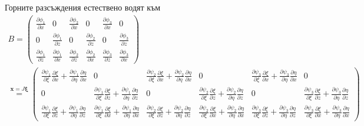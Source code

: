 \documentclass{report}
\begin{document}
	Горните разсъждения естествено водят към
	\begin{align*}
		B=		\begin{pmatrix}
			\frac{\partial \phi_1}{\partial x} & 0 & \frac{\partial \phi_2}{\partial x} & 0 & \frac{\partial \phi_3}{\partial x} & 0\\
			0 & \frac{\partial \phi_1}{\partial z} & 0 & \frac{\partial \phi_2}{\partial z} & 0 & \frac{\partial \phi_3}{\partial z}\\
			\frac{\partial \phi_1}{\partial z} & \frac{\partial \phi_1}{\partial x} & \frac{\partial \phi_2}{\partial z} & \frac{\partial \phi_2}{\partial x} & 
			\frac{\partial \phi_3}{\partial z} & \frac{\partial \phi_3}{\partial x} 
		\end{pmatrix}\\
		\overset{\mathbf{x}=J\mathbf{\xi}}{=} 
		\begin{pmatrix}
			\frac{\partial \psi_1}{\partial \xi}\frac{\partial \xi}{\partial x} + \frac{\partial \psi_1}{\partial \eta}\frac{\partial \eta}{\partial x} & 0 & \frac{\partial \psi_2}{\partial \xi}\frac{\partial \xi}{\partial x} + \frac{\partial \psi_2}{\partial \eta}\frac{\partial \eta}{\partial x} & 0 & \frac{\partial \psi_3}{\partial \xi}\frac{\partial \xi}{\partial x} + \frac{\partial \psi_3}{\partial \eta}\frac{\partial \eta}{\partial x} & 0\\
			0 & \frac{\partial \psi_1}{\partial \xi}\frac{\partial \xi}{\partial z} + \frac{\partial \psi_1}{\partial \eta}\frac{\partial \eta}{\partial z} & 0 & \frac{\partial \psi_2}{\partial \xi}\frac{\partial \xi}{\partial z} + \frac{\partial \psi_2}{\partial \eta}\frac{\partial \eta}{\partial z} & 0 & \frac{\partial \psi_3}{\partial \xi}\frac{\partial \xi}{\partial z} + \frac{\partial \psi_3}{\partial \eta}\frac{\partial \eta}{\partial z}\\
			\frac{\partial \psi_1}{\partial \xi}\frac{\partial \xi}{\partial z} + \frac{\partial \psi_1}{\partial \eta}\frac{\partial \eta}{\partial z} & \frac{\partial \psi_1}{\partial \xi}\frac{\partial \xi}{\partial x} + \frac{\partial \psi_1}{\partial \eta}\frac{\partial \eta}{\partial x} & \frac{\partial \psi_2}{\partial \xi}\frac{\partial \xi}{\partial z} + \frac{\partial \psi_2}{\partial \eta}\frac{\partial \eta}{\partial z} & \frac{\partial \psi_2}{\partial \xi}\frac{\partial \xi}{\partial x} + \frac{\partial \psi_2}{\partial \eta}\frac{\partial \eta}{\partial x} & 
			\frac{\partial \psi_3}{\partial \xi}\frac{\partial \xi}{\partial z} + \frac{\partial \psi_3}{\partial \eta}\frac{\partial \eta}{\partial z} &
			\frac{\partial \psi_3}{\partial \xi}\frac{\partial \xi}{\partial x} + \frac{\partial \psi_3}{\partial \eta}\frac{\partial \eta}{\partial x}		

\end{pmatrix}
\end{align*}
\end{document}
